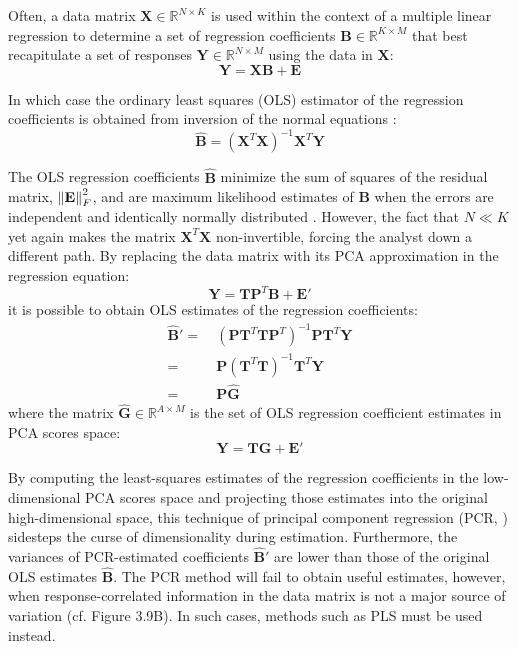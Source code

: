 \begin{doublespace}
Often, a data matrix $\mathbf{X} \in \mathbb{R}^{N \times K}$ is used within
the context of a multiple linear regression to determine a set of regression
coefficients $\mathbf{B} \in \mathbb{R}^{K \times M}$ that best recapitulate
a set of responses $\mathbf{Y} \in \mathbb{R}^{N \times M}$ using the data in
$\mathbf{X}$:
\begin{equation}
\mathbf{Y} = \mathbf{X} \mathbf{B} + \mathbf{E}
\end{equation}

In which case the ordinary least squares (OLS) estimator of the regression
coefficients is obtained from inversion of the normal equations
\cite{draper1998}:
\begin{equation}
\hat{\mathbf{B}} = (\mathbf{X}^T \mathbf{X})^{-1} \mathbf{X}^T \mathbf{Y}
\end{equation}

The OLS regression coefficients $\hat{\mathbf{B}}$ minimize the sum of squares
of the residual matrix, $\left\| \mathbf{E} \right\|_F^2$, and are maximum likelihood
estimates of $\mathbf{B}$ when the errors are independent and identically
normally distributed \cite{draper1998}. However, the fact that $N \ll K$ yet
again makes the matrix $\mathbf{X}^T \mathbf{X}$ non-invertible, forcing the
analyst down a different path. By replacing the data matrix with its PCA
approximation in the regression equation:
\begin{equation}
\mathbf{Y} = \mathbf{T} \mathbf{P}^T \mathbf{B} + \mathbf{E}'
\end{equation}
it is possible to obtain OLS estimates of the regression coefficients:
\begin{align}
\hat{\mathbf{B}}'
 =& \: (\mathbf{P} \mathbf{T}^T \mathbf{T} \mathbf{P}^T)^{-1}
       \mathbf{P} \mathbf{T}^T \mathbf{Y}
 \nonumber \\
 =& \: \mathbf{P} (\mathbf{T}^T \mathbf{T})^{-1} \mathbf{T}^T \mathbf{Y}
 \\
 =& \: \mathbf{P} \hat{\mathbf{G}}
\end{align}
where the matrix $\hat{\mathbf{G}} \in \mathbb{R}^{A \times M}$ is the set of
OLS regression coefficient estimates in PCA scores space:
\begin{equation}
\mathbf{Y} = \mathbf{T} \mathbf{G} + \mathbf{E}'
\end{equation}

By computing the least-squares estimates of the regression coefficients in the
low-dimensional PCA scores space and projecting those estimates into the
original high-dimensional space, this technique of principal component
regression (PCR, \cite{jolliffe2002}) sidesteps the curse of dimensionality
during estimation. Furthermore, the variances of PCR-estimated coefficients
$\hat{\mathbf{B}}'$ are lower than those of the original OLS estimates
$\hat{\mathbf{B}}$. The PCR method will fail to obtain useful estimates,
however, when response-correlated information in the data matrix is not
a major source of variation (cf. Figure 3.9B). In such cases, methods such
as PLS must be used instead.
\end{doublespace}

